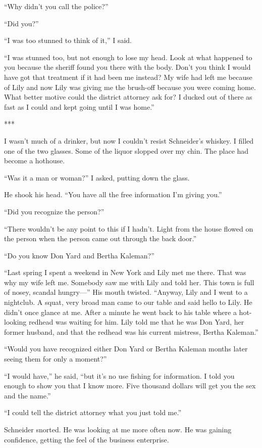 \documentclass{novel}
\begin{document}
{“Why didn’t you call the police?”

“Did you?”

“I was too stunned to think of it,” I said.

“I was stunned too, but not enough to lose my head. Look at what happened to you because the sheriff found you there with the body. Don’t you think I would have got that treatment if it had been me instead? My wife had left me because of Lily and now Lily was giving me the brush-off because you were coming home. What better motive could the district attorney ask for? I ducked out of there as fast as I could and kept going until I was home.”

***

I wasn’t much of a drinker, but now I couldn’t resist Schneider’s whiskey. I filled one of the two glasses. Some of the liquor slopped over my chin. The place had become a hothouse.

“Was it a man or woman?” I asked, putting down the glass.

He shook his head. “You have all the free information I’m giving you.”

“Did you recognize the person?”

“There wouldn’t be any point to this if I hadn’t. Light from the house flowed on the person when the person came out through the back door.”

“Do you know Don Yard and Bertha Kaleman?”

“Last spring I spent a weekend in New York and Lily met me there. That was why my wife left me. Somebody saw me with Lily and told her. This town is full of nosey, scandal hungry—” His mouth twisted. “Anyway, Lily and I went to a nightclub. A squat, very broad man came to our table and said hello to Lily. He didn’t once glance at me. After a minute he went back to his table where a hot-looking redhead was waiting for him. Lily told me that he was Don Yard, her former husband, and that the redhead was his current mistress, Bertha Kaleman.”

“Would you have recognized either Don Yard or Bertha Kaleman months later seeing them for only a moment?”

“I would have,” he said, “but it’s no use fishing for information. I told you enough to show you that I know more. Five thousand dollars will get you the sex and the name.”

“I could tell the district attorney what you just told me.”

Schneider snorted. He was looking at me more often now. He was gaining confidence, getting the feel of the business enterprise.

}
\end{document}
